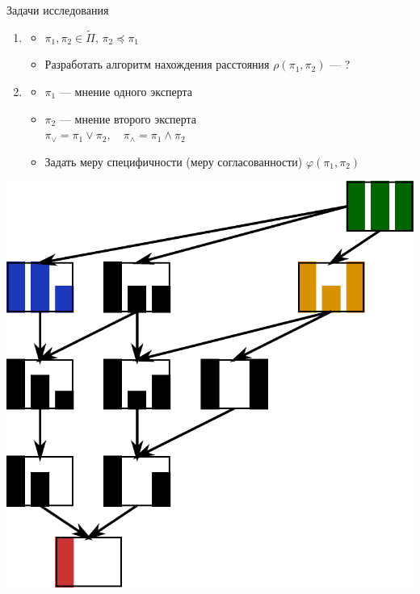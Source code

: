 \documentclass[russian, unicode, mathserif, aspectratio=169]{beamer}
\begin{document}

\begin{frame}{Задачи исследования}
    \begin{minipage}{0.5\textwidth}
    \begin{enumerate}
        \item
        \begin{itemize}
            \item $\pi_1, \pi_2 \in \widetilde{\Pi}$, $\pi_2 \preceq \pi_1$
            \item Разработать алгоритм нахождения расстояния $\rho(\pi_1, \pi_2)$ --- ?
        \end{itemize}
        \item
        \begin{itemize}
            \item $\pi_1$ --- мнение одного эксперта
            \item $\pi_2$ --- мнение второго эксперта\\
            $\pi_{\lor}=\pi_1 \lor \pi_2, \quad \pi_{\land} = \pi_1 \land \pi_2$
            \item Задать меру специфичности (меру согласованности) $\varphi(\pi_1, \pi_2)$
        \end{itemize}
    \end{enumerate}
    \end{minipage}
    \begin{minipage}{0.45\textwidth}
		\includegraphics[width=\textwidth]{pictures/three-point-omega-example.pdf}
	\end{minipage}
\end{frame}
\end{document}
